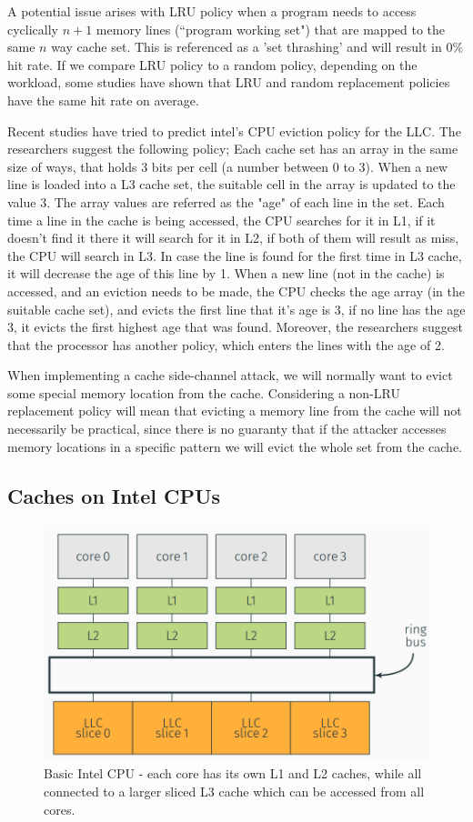 A potential issue arises with LRU policy when a program needs to access
cyclically $n+1$ memory lines (``program working set") that are mapped to the
same $n$ way cache set. This is referenced as a 'set thrashing' and will result
in $0\%$ hit rate. If we compare LRU policy to a random policy, depending on the
workload, some studies have shown that LRU and random replacement policies have
the same hit rate on average.

Recent studies have tried to predict intel's CPU eviction policy for the LLC. The researchers suggest the following policy;
Each cache set has an array in the same size of ways, that holds 3 bits per cell (a number between 0 to 3).
When a new line is loaded into a L3 cache set, the suitable cell in the array is updated to the value 3.
The array values are referred as the "age" of each line in the set.
Each time a line in the cache is being accessed, the CPU searches for it in L1, if it doesn't find it there it will search for it in L2, if both of them will result as miss, the CPU will search in L3.
In case the line is found for the first time in L3 cache, it will decrease the age of this line by 1.
When a new line (not in the cache) is accessed, and an eviction needs to be made, the CPU checks the age array (in the suitable cache set), and evicts the first line that it's age is 3, if no line has the age 3, it evicts the first highest age that was found.
Moreover, the researchers suggest that the processor has another policy, which enters the lines with the age of 2.

When implementing a cache side-channel attack, we will normally want to
evict some special memory location from the cache. Considering a non-LRU
replacement policy will mean that evicting a memory line from the cache will not
necessarily be practical, since there is no guaranty that if the attacker accesses
memory locations in a specific pattern we will evict the whole set from the
cache. 
\subsection{Caches on Intel CPUs}
\label{subsec:cachesonintelcpus}
\begin{figure}
    \centering
    \includegraphics[width=\textwidth]{images/chapter_6/IntelCPU.PNG}
    \caption{Basic Intel CPU - each core has its own L1 and L2 caches, while all connected to a larger sliced L3 cache which can be accessed from all cores. }
    \label{fig:IntelCPU}
\end{figure}

